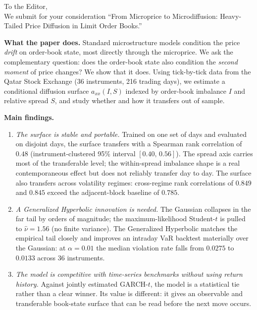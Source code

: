 \documentclass[11pt,a4paper]{article}
\begin{document}
\noindent
To the Editor,\\[1em]

We submit for your consideration ``From Microprice to Microdiffusion: Heavy-Tailed
Price Diffusion in Limit Order Books.''

\bigskip
\noindent\textbf{What the paper does.}
Standard microstructure models condition the price \emph{drift} on order-book state,
most directly through the microprice. We ask the complementary question: does the
order-book state also condition the \emph{second moment} of price changes? We show that
it does. Using tick-by-tick data from the Qatar Stock Exchange (36 instruments, 216
trading days), we estimate a conditional diffusion surface $a_{xx}(I,S)$ indexed by
order-book imbalance $I$ and relative spread $S$, and study whether and how it
transfers out of sample.

\bigskip
\noindent\textbf{Main findings.}
\begin{enumerate}

\item \emph{The surface is stable and portable.} Trained on one set of
  days and evaluated on disjoint days, the surface transfers with a Spearman rank
  correlation of $0.48$ (instrument-clustered 95\% interval $[0.40,\,0.56]$). The
  spread axis carries most of the transferable level; the within-spread imbalance
  shape is a real contemporaneous effect but does not reliably transfer day to day.
  The surface also transfers across volatility regimes: cross-regime rank correlations
  of $0.849$ and $0.845$ exceed the adjacent-block baseline of $0.785$.

\item \emph{A Generalized Hyperbolic innovation is needed.} The Gaussian collapses in
  the far tail by orders of magnitude; the maximum-likelihood Student-$t$ is pulled to
  $\hat{\nu}=1.56$ (no finite variance). The Generalized Hyperbolic matches the
  empirical tail closely and improves an intraday VaR backtest materially over the
  Gaussian: at $\alpha=0.01$ the median violation rate falls from $0.0275$ to
  $0.0133$ across 36 instruments.

\item \emph{The model is competitive with time-series benchmarks without using return
  history.} Against jointly estimated GARCH-$t$, the model is a statistical tie rather
  than a clear winner. Its value is different: it gives an observable and transferable
  book-state surface that can be read before the next move occurs.

\end{enumerate}
\end{document}
